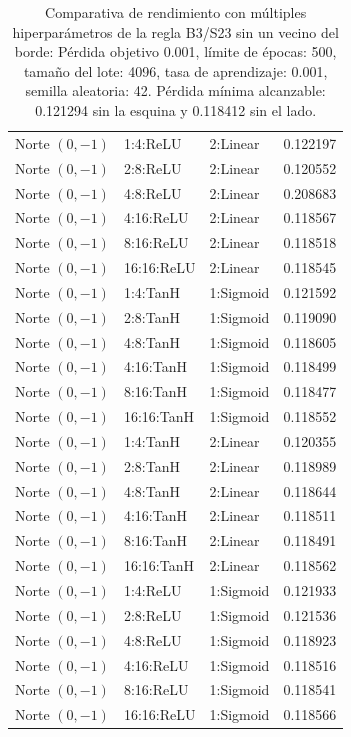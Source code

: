 \begin{table}[h]
\begin{tabular}{lllr}
		\midrule
		Norte $(0,-1)$ & 1:4:ReLU & 2:Linear & 0.122197 \\
		Norte $(0,-1)$ & 2:8:ReLU & 2:Linear & 0.120552 \\
		Norte $(0,-1)$ & 4:8:ReLU & 2:Linear & 0.208683 \\
		Norte $(0,-1)$ & 4:16:ReLU & 2:Linear & 0.118567 \\
		Norte $(0,-1)$ & 8:16:ReLU & 2:Linear & 0.118518 \\
		Norte $(0,-1)$ & 16:16:ReLU & 2:Linear & 0.118545 \\
		Norte $(0,-1)$ & 1:4:TanH & 1:Sigmoid & 0.121592 \\
		Norte $(0,-1)$ & 2:8:TanH & 1:Sigmoid & 0.119090 \\
		Norte $(0,-1)$ & 4:8:TanH & 1:Sigmoid & 0.118605 \\
		Norte $(0,-1)$ & 4:16:TanH & 1:Sigmoid & 0.118499 \\
		Norte $(0,-1)$ & 8:16:TanH & 1:Sigmoid & 0.118477 \\
		Norte $(0,-1)$ & 16:16:TanH & 1:Sigmoid & 0.118552 \\
		Norte $(0,-1)$ & 1:4:TanH & 2:Linear & 0.120355 \\
		Norte $(0,-1)$ & 2:8:TanH & 2:Linear & 0.118989 \\
		Norte $(0,-1)$ & 4:8:TanH & 2:Linear & 0.118644 \\
		Norte $(0,-1)$ & 4:16:TanH & 2:Linear & 0.118511 \\
		Norte $(0,-1)$ & 8:16:TanH & 2:Linear & 0.118491 \\
		Norte $(0,-1)$ & 16:16:TanH & 2:Linear & 0.118562 \\
		Norte $(0,-1)$ & 1:4:ReLU & 1:Sigmoid & 0.121933 \\
		Norte $(0,-1)$ & 2:8:ReLU & 1:Sigmoid & 0.121536 \\
		Norte $(0,-1)$ & 4:8:ReLU & 1:Sigmoid & 0.118923 \\
		Norte $(0,-1)$ & 4:16:ReLU & 1:Sigmoid & 0.118516 \\
		Norte $(0,-1)$ & 8:16:ReLU & 1:Sigmoid & 0.118541 \\
		Norte $(0,-1)$ & 16:16:ReLU & 1:Sigmoid & 0.118566 \\
		\bottomrule
	\end{tabular}
	\caption{Comparativa de rendimiento con múltiples hiperparámetros de la regla B3/S23 sin un vecino del borde: Pérdida objetivo 0.001, límite de épocas: 500, tamaño del lote: 4096, tasa de aprendizaje: 0.001, semilla aleatoria: 42. Pérdida mínima alcanzable: 0.121294 sin la esquina y 0.118412 sin el lado.}
	\label{tab:nca_gol_reduction_borde}
\end{table}
